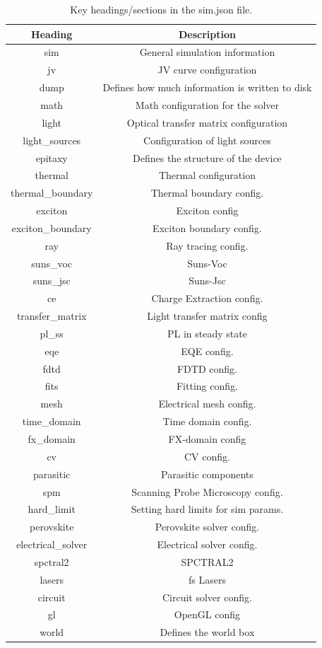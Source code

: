 \begin{table}[H]
\begin{center}
\begin{tabular}{ |c|c| } 
 \hline
	Heading 			& 	Description  \\ 
 \hline
	sim					&	General simulation information \\
	jv					&	JV curve configuration \\
	dump				&	Defines how much information is written to disk \\
	math				&	Math configuration for the solver \\
	light				&	Optical transfer matrix configuration \\
	light\_sources		&	Configuration of light sources\\
	epitaxy				&	Defines the structure of the device\\
	thermal				&	Thermal configuration\\
	thermal\_boundary	&	Thermal boundary config.\\
	exciton				&	Exciton config\\
	exciton\_boundary	&	Exciton boundary config. \\
	ray					&	Ray tracing config.\\
	suns\_voc			&	Suns-Voc\\
	suns\_jsc			&	Suns-Jsc\\
	ce					&	Charge Extraction config.\\
	transfer\_matrix	&	Light transfer matrix config\\
	pl\_ss				&	PL in steady state\\
	eqe					&	EQE config.\\
	fdtd				&	FDTD config.\\
	fits				&	Fitting config.\\
	mesh				&	Electrical mesh config.\\
	time\_domain		&	Time domain config.\\
	fx\_domain			&	FX-domain config\\
	cv					&	CV config.\\
	parasitic			&	Parasitic components\\
	spm					&	Scanning Probe Microscopy config.\\
	hard\_limit			&	Setting hard limits for sim params.\\
	perovskite			&	Perovskite solver config.\\
	electrical\_solver	&	Electrical solver config.\\
	spctral2			&	SPCTRAL2\\
	lasers				&	fs Lasers \\
	circuit				&	Circuit solver config.\\
	gl					&	OpenGL config\\
	world				&	Defines the world box\\
 \hline
\end{tabular}
\caption{Key headings/sections in the sim.json file.}
\label{fig:jsontab}
\end{center}
\end{table}

